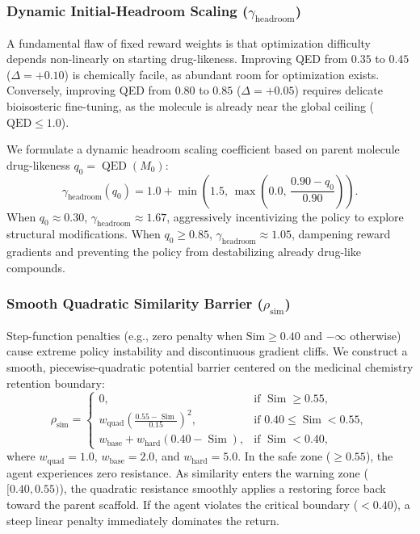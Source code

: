 \documentclass{ieeeaccess}
\begin{document}
\subsubsection{Dynamic Initial-Headroom Scaling ($\gamma_{\text{headroom}}$)}
A fundamental flaw of fixed reward weights is that optimization difficulty depends non-linearly on starting drug-likeness. Improving QED from $0.35$ to $0.45$ ($\Delta = +0.10$) is chemically facile, as abundant room for optimization exists. Conversely, improving QED from $0.80$ to $0.85$ ($\Delta = +0.05$) requires delicate bioisosteric fine-tuning, as the molecule is already near the global ceiling ($\text{QED} \le 1.0$). 

We formulate a dynamic headroom scaling coefficient based on parent molecule drug-likeness $q_0 = \operatorname{QED}(M_0)$:
\begin{equation}
\gamma_{\text{headroom}}(q_0) = 1.0 + \min\left(1.5, \, \max\left(0.0, \, \frac{0.90 - q_0}{0.90}\right)\right).
\label{eq:headroom}
\end{equation}
When $q_0 \approx 0.30$, $\gamma_{\text{headroom}} \approx 1.67$, aggressively incentivizing the policy to explore structural modifications. When $q_0 \ge 0.85$, $\gamma_{\text{headroom}} \approx 1.05$, dampening reward gradients and preventing the policy from destabilizing already drug-like compounds.

\subsubsection{Smooth Quadratic Similarity Barrier ($\rho_{\text{sim}}$)}
Step-function penalties (e.g., zero penalty when $\text{Sim} \ge 0.40$ and $-\infty$ otherwise) cause extreme policy instability and discontinuous gradient cliffs. We construct a smooth, piecewise-quadratic potential barrier centered on the medicinal chemistry retention boundary:
\begin{equation}
\rho_{\text{sim}} = \begin{cases}
0, & \text{if } \operatorname{Sim} \ge 0.55, \\
w_{\text{quad}} \left( \frac{0.55 - \operatorname{Sim}}{0.15} \right)^2, & \text{if } 0.40 \le \operatorname{Sim} < 0.55, \\
w_{\text{base}} + w_{\text{hard}} (0.40 - \operatorname{Sim}), & \text{if } \operatorname{Sim} < 0.40,
\end{cases}
\label{eq:smooth_barrier}
\end{equation}
where $w_{\text{quad}} = 1.0$, $w_{\text{base}} = 2.0$, and $w_{\text{hard}} = 5.0$. In the safe zone ($\ge 0.55$), the agent experiences zero resistance. As similarity enters the warning zone ($[0.40, 0.55)$), the quadratic resistance smoothly applies a restoring force back toward the parent scaffold. If the agent violates the critical boundary ($<0.40$), a steep linear penalty immediately dominates the return.
\end{document}
